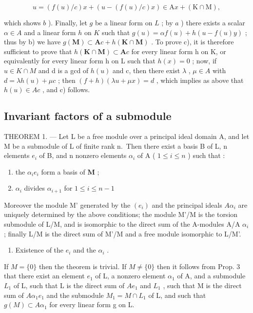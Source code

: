 \[
u = (f (u) / c) x + (u - (f (u) / c) x) \in \mathrm{A} x + (\mathrm{K} \cap \mathrm{M}),
\]

which shows \(b\) ). Finally, let \(g\) be a linear form on \(L\) ; by \(a\) ) there exists a scalar \(\alpha \in A\) and a linear form \(h\) on \(K\) such that \(g(u) = \alpha f(u) + h(u - f(u)y)\) ; thus by b) we have \(g(\mathbf{M}) \subset \mathbf{A}c + h(\mathbf{K} \cap \mathbf{M})\) . To prove c), it is therefore sufficient to prove that \(h(\mathbf{K} \cap \mathbf{M}) \subset \mathbf{A}c\) for every linear form h on K, or equivalently for every linear form h on L such that \(h(x) = 0\) ; now, if \(u \in K \cap M\) and d is a gcd of \(h(u)\) and c, then there exist \(\lambda\) , \(\mu \in A\) with \(d = \lambda h(u) + \mu c\) ; then \((f + h)(\lambda u + \mu x) = d\) , which implies as above that \(h(u) \in Ac\) , and c) follows.

\subsection{Invariant factors of a submodule}

THEOREM 1. --- Let L be a free module over a principal ideal domain A, and let M be a submodule of L of finite rank n.~Then there exist a basis B of L, n elements \(e_{i}\) of B, and n nonzero elements \(\alpha_{i}\) of A ( \(1 \leqslant i \leqslant n\) ) such that :

\begin{enumerate}
\def\labelenumi{\alph{enumi})}
\item
  the \(\alpha_{i}e_{i}\) form a basis of \(\mathbf{M}\) ;
\item
  \(\alpha_{i}\) divides \(\alpha_{i + 1}\) for \(1\leqslant i\leqslant n - 1\)
\end{enumerate}

Moreover the module M' generated by the \((e_{i})\) and the principal ideals \(A\alpha_{i}\) are uniquely determined by the above conditions; the module M'/M is the torsion submodule of L/M, and is isomorphic to the direct sum of the A-modules A/A \(\alpha_{i}\) ; finally L/M is the direct sum of M'/M and a free module isomorphic to L/M'.

\begin{enumerate}
\def\labelenumi{\arabic{enumi})}
\tightlist
\item
  Existence of the \(e_i\) and the \(\alpha_i\) .
\end{enumerate}

If \(M = \{0\}\) then the theorem is trivial. If \(M \neq \{0\}\) then it follows from Prop. 3 that there exist an element \(e_{1}\) of L, a nonzero element \(\alpha_{1}\) of A, and a submodule \(L_{1}\) of L, such that L is the direct sum of \(Ae_{1}\) and \(L_{1}\) , such that M is the direct sum of \(A\alpha_{1}e_{1}\) and the submodule \(M_{1} = M \cap L_{1}\) of L, and such that \(g(M) \subset A\alpha_{1}\) for every linear form g on L.

